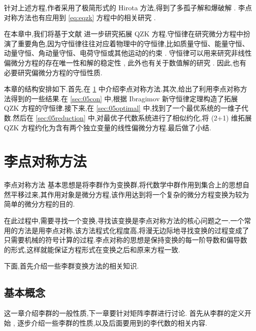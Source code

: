 针对上述方程,作者采用了极简形式的 Hirota 方法,得到了多孤子解和爆破解 \cite{biswas2013soli,bluman2010appli}. 李点对称方法也有应用到 \eqref{eq:eqzk} 方程中的相关研究 \cite{sjoberg2007dou}.

在本章中,我们将基于文献 \cite{wang2014soli} 进一步研究拓展 QZK 方程.守恒律在研究微分方程中扮演了重要角色,因为守恒律往往对应着物理中的守恒律,比如质量守恒、能量守恒、动量守恒、角动量守恒、电荷守恒或其他运动的约束 \cite{mushtaq2005non,song2013top,song2013dom}. 守恒律可以用来研究非线性偏微分方程的存在唯一性和解的稳定性 \cite{wang2014soli}, 此外也有关于数值解的研究 \cite{wazwaz2005exact,wazwaz2008the}. 因此,也有必要研究偏微分方程的守恒性质.

本章的结构安排如下.首先,在 \ref{sec:05lie} 中介绍李点对称方法.其次,给出了利用李点对称方法得到的一些结果.在 \ref{sec:05con} 中,根据 Ibragimov 新守恒律定理构造了拓展 QZK 方程的守恒律.接下来,在 \ref{sec:05optimal} 中,找到了一个最优系统的一维子代数.然后在 \ref{sec:05reduction} 中,对最优子代数系统进行了相似约化,将 (2+1) 维拓展 QZK 方程约化为含有两个独立变量的线性偏微分方程.最后做了小结.

\section{李点对称方法}\label{sec:05lie}
李点对称方法 \cite{peter2000sym,bluman2008symmetry} 基本思想是将李群作为变换群,将代数学中群作用到集合上的思想自然平移过来,其作用对象是微分方程,该作用达到将一个复杂的微分方程变换为较为简单的微分方程的目的.

在此过程中,需要寻找一个变换,寻找该变换是李点对称方法的核心问题之一.一个常用的方法是用李点对称,该方法程式化程度高,将漫无边际地寻找变换的过程变成了只需要机械的符号计算的过程.李点对称的思想是保持变换的每一阶导数和偏导数的形式,这样就能保证方程形式在变换之后和原来方程一致.

下面,首先介绍一些李群变换方法的相关知识.

\subsection{基本概念}
这一章介绍李群的一般性质,下一章要针对矩阵李群进行讨论.
首先从李群的定义开始 \cite{kirillov2008anintro}, 逐步介绍一些李群的性质,以及后面要用到的李代数的相关内容.


